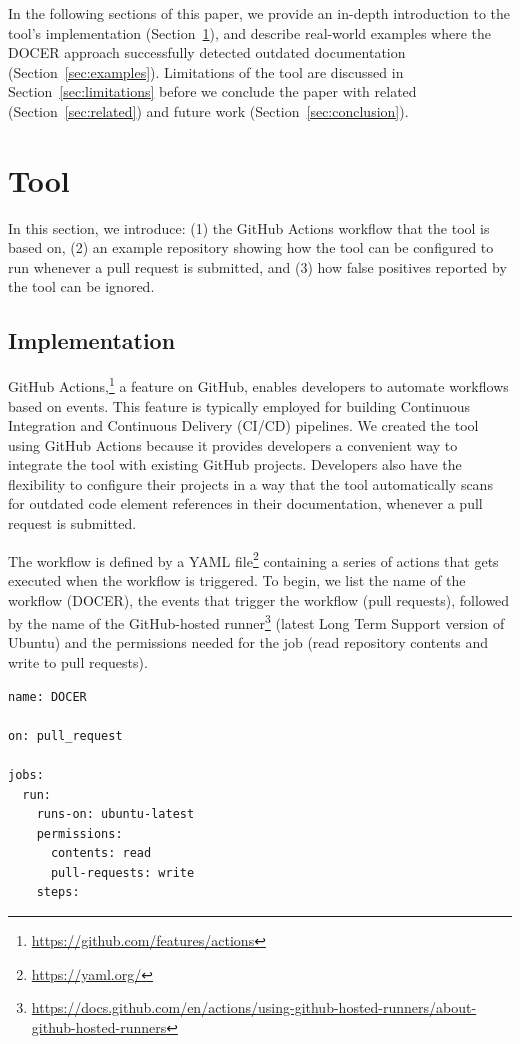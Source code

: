 \documentclass[conference]{IEEEtran}
\begin{document}
In the following sections of this paper, we provide an in-depth introduction to the tool's implementation (Section~\ref{sec:tool}), and describe real-world examples where the DOCER approach successfully detected outdated documentation (Section~\ref{sec:examples}). Limitations of the tool are discussed in Section~\ref{sec:limitations} before we conclude the paper with related (Section~\ref{sec:related}) and future work (Section~\ref{sec:conclusion}).

\section{Tool}
\label{sec:tool}
In this section, we introduce: (1) the GitHub Actions workflow that the tool is based on, (2) an example repository showing how the tool can be configured to run whenever a pull request is submitted, and (3) how false positives reported by the tool can be ignored.

\subsection{Implementation}
\label{sec:tool_implementation}
GitHub Actions,\footnote{\url{https://github.com/features/actions}} a feature on GitHub, enables developers to automate workflows based on events. This feature is typically employed for building Continuous Integration and Continuous Delivery (CI/CD) pipelines. We created the tool using GitHub Actions because it provides developers a convenient way to integrate the tool with existing GitHub projects. Developers also have the flexibility to configure their projects in a way that the tool automatically scans for outdated code element references in their documentation, whenever a pull request is submitted.

The workflow is defined by a YAML file\footnote{\url{https://yaml.org/}} containing a series of actions that gets executed when the workflow is triggered. To begin, we list the name of the workflow (DOCER), the events that trigger the workflow (pull requests), followed by the name of the GitHub-hosted runner\footnote{\url{https://docs.github.com/en/actions/using-github-hosted-runners/about-github-hosted-runners}} (latest Long Term Support version of Ubuntu) and the permissions needed for the job (read repository contents and write to pull requests).
\begin{verbatim}
name: DOCER

on: pull_request

jobs:
  run:
    runs-on: ubuntu-latest
    permissions:
      contents: read
      pull-requests: write
    steps:
\end{verbatim}
\end{document}
